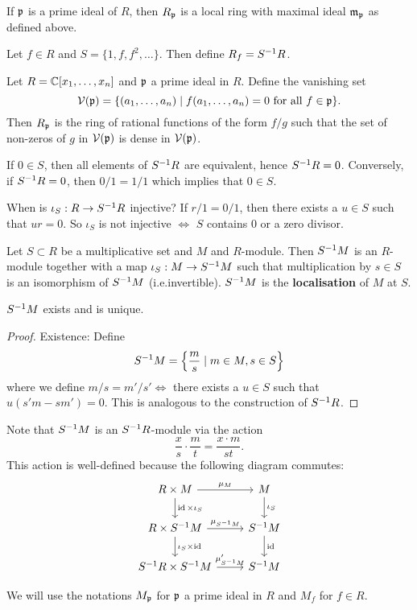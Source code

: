 \begin{prop}
  If $\mathfrak{p}$ is a prime ideal of $R$, then $R_{\mathfrak{p}}$ is a local ring with maximal ideal $\mathfrak{m}_{\mathfrak{p}}$ as defined above.
\end{prop}

\begin{exam}
  \leavevmode
  \begin{enum}
    \io
    Let $f \in R$ and $S = \{1,f,f^2,\ldots\}$.
    Then define $R_f = S^{-1} R$.

    \io
    Let $R = \mathbb{C}[x_1,\ldots,x_n]$ and $\mathfrak{p}$ a prime ideal in $R$.
    Define the vanishing set
    \[\mathcal{V}(\mathfrak{p}) = \{(a_1,\ldots,a_n) \mid f(a_1,\ldots,a_n)=0 \text{ for all } f \in \mathfrak{p}\}.\]
    Then $R_{\mathfrak{p}}$ is the ring of rational functions of the form $f/g$ such that the set of non-zeros of $g$ in $\mathcal{V}(\mathfrak{p})$ is dense in $\mathcal{V}(\mathfrak{p})$.

    \io
    If $0 \in S$, then all elements of $S^{-1} R$ are equivalent, hence $S^{-1} R = 0$.
    Conversely, if $S^{-1} R=0$, then $0/1=1/1$ which implies that $0 \in S$.

    \io
    When is $\iota_S: R \to S^{-1} R$ injective?
    If $r/1=0/1$, then there exists a $u \in S$ such that $ur=0$.
    So $\iota_S$ is not injective $\iff$ $S$ contains $0$ or a zero divisor.
  \end{enum}
\end{exam}

\begin{defn}[2.4]
  Let $S \subset R$ be a multiplicative set and $M$ and $R$-module.
  Then $S^{-1} M$ is an $R$-module together with a map $\iota_S: M \to S^{-1} M$ such that multiplication by $s \in S$ is an isomorphism of $S^{-1} M$ (i.e.\@ invertible).
  $S^{-1} M$ is the \textbf{localisation} of $M$ at $S$.
\end{defn}

\begin{prop}[2.5]
  $S^{-1} M$ exists and is unique.
\end{prop}

\begin{proof}
  Existence:
  Define
  \[S^{-1} M = \left\{ \frac{m}{s} \mid m \in M, s \in S \right\}\]
  where we define $m/s=m'/s' \iff$ there exists a $u \in S$ such that $u(s'm-sm')=0$.
  This is analogous to the construction of $S^{-1} R$.
\end{proof}

\begin{rmk}
  Note that $S^{-1} M$ is an $S^{-1} R$-module via the action
  \[\frac{x}{s} \cdot \frac{m}{t} = \frac{x \cdot m}{st}.\]
  This action is well-defined because the following diagram commutes:
  \begin{equation*}
    \begin{tikzcd}
      R \times M \ar[r, "\mu_M"] \ar[d, "\id \times \iota_S"] & M \ar[d, "\iota_S"] \\
      R \times S\inv M \ar[r, "\mu_{S\inv M}"] \ar[d, "\iota_S \times \id"] & S\inv M \ar[d, "\id"] \\
      S\inv R \times S\inv M \ar[r, "\mu_{S\inv M}'"] & S\inv M
    \end{tikzcd}
  \end{equation*}
\end{rmk}

\begin{rmk}
  We will use the notations $M_{\mathfrak{p}}$ for $\mathfrak{p}$ a prime ideal in $R$ and $M_f$ for $f \in R$.
\end{rmk}
